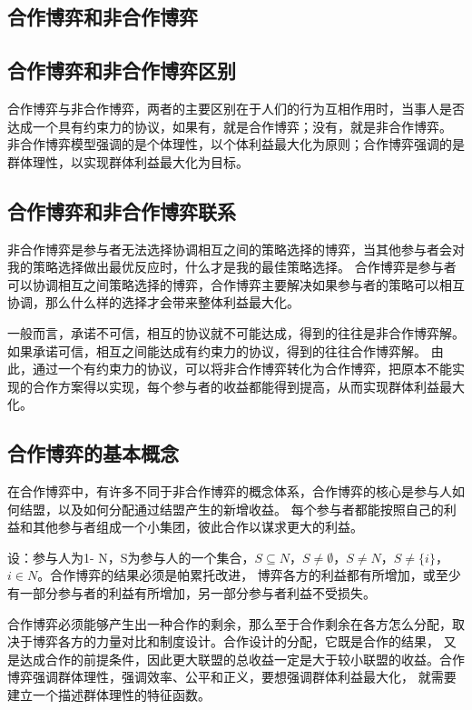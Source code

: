 \documentclass[12pt, a4paper]{article} %
\begin{document}
\begin{CJK*}{UTF8}{gbsn}
        \clearpage
        \section{合作博弈和非合作博弈}

        \subsection{合作博弈和非合作博弈区别}
        合作博弈与非合作博弈，两者的主要区别在于人们的行为互相作用时，当事人是否达成一个具有约束力的协议，如果有，就是合作博弈；没有，就是非合作博弈。
        非合作博弈模型强调的是个体理性，以个体利益最大化为原则；合作博弈强调的是群体理性，以实现群体利益最大化为目标。

        \subsection{合作博弈和非合作博弈联系}
        非合作博弈是参与者无法选择协调相互之间的策略选择的博弈，当其他参与者会对我的策略选择做出最优反应时，什么才是我的最佳策略选择。
        合作博弈是参与者可以协调相互之间策略选择的博弈，合作博弈主要解决如果参与者的策略可以相互协调，那么什么样的选择才会带来整体利益最大化。\par
        一般而言，承诺不可信，相互的协议就不可能达成，得到的往往是非合作博弈解。如果承诺可信，相互之间能达成有约束力的协议，得到的往往合作博弈解。
        由此，通过一个有约束力的协议，可以将非合作博弈转化为合作博弈，把原本不能实现的合作方案得以实现，每个参与者的收益都能得到提高，从而实现群体利益最大化。\par

        \subsection{合作博弈的基本概念}
        在合作博弈中，有许多不同于非合作博弈的概念体系，合作博弈的核心是参与人如何结盟，以及如何分配通过结盟产生的新增收益。
        每个参与者都能按照自己的利益和其他参与者组成一个小集团，彼此合作以谋求更大的利益。\par

        设：参与人为1- N，S为参与人的一个集合，$S \subseteq N$，$S \neq \emptyset$，$S \neq N$，$S \neq \{i\}$，$i \in N$。合作博弈的结果必须是帕累托改进，
        博弈各方的利益都有所增加，或至少有一部分参与者的利益有所增加，另一部分参与者利益不受损失。\par

        合作博弈必须能够产生出一种合作的剩余，那么至于合作剩余在各方怎么分配，取决于博弈各方的力量对比和制度设计。合作设计的分配，它既是合作的结果，
        又是达成合作的前提条件，因此更大联盟的总收益一定是大于较小联盟的收益。合作博弈强调群体理性，强调效率、公平和正义，要想强调群体利益最大化，
        就需要建立一个描述群体理性的特征函数。


\end{CJK*}
\end{document}
